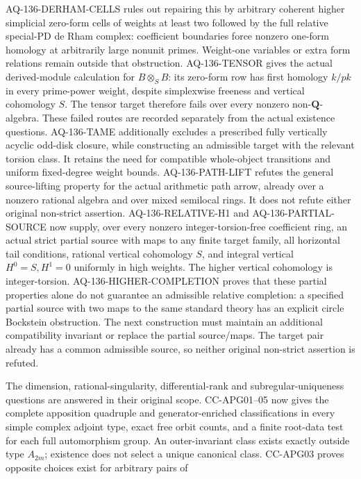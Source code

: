 \begin{description}[style=nextline,leftmargin=0pt]
AQ-136-DERHAM-CELLS rules out repairing this by arbitrary coherent
higher simplicial zero-form cells of weights at least two followed
by the full relative special-PD de Rham complex: coefficient
boundaries force nonzero one-form homology at arbitrarily large
nonunit primes. Weight-one variables or extra form relations
remain outside that obstruction.
AQ-136-TENSOR gives the actual derived-module calculation for
$B\otimes_S B$: its zero-form row has first homology $k/pk$
in every prime-power weight, despite simplexwise freeness and vertical
cohomology $S$. The tensor target therefore fails over every nonzero
non-$\mathbf Q$-algebra. These failed routes are recorded
separately from the actual existence questions.
AQ-136-TAME additionally excludes a prescribed fully vertically
acyclic odd-disk closure, while constructing an admissible target
with the relevant torsion class. It retains the need for compatible
whole-object transitions and uniform fixed-degree weight bounds. AQ-136-PATH-LIFT refutes the
general source-lifting property for the actual arithmetic path arrow,
already over a nonzero rational algebra and over mixed semilocal rings.
It does not refute either original non-strict assertion. AQ-136-RELATIVE-H1 and AQ-136-PARTIAL-SOURCE
now supply, over every nonzero integer-torsion-free coefficient ring,
an actual strict partial source with maps to any finite target family,
all horizontal tail conditions, rational vertical cohomology $S$,
and integral vertical $H^0=S,H^1=0$ uniformly in high weights.
The higher vertical cohomology is integer-torsion.
AQ-136-HIGHER-COMPLETION proves that these partial properties alone
do not guarantee an admissible relative completion: a specified
partial source with two maps to the same standard theory has an
explicit circle Bockstein obstruction. The next construction must
maintain an additional compatibility invariant or replace the partial
source/maps. The target pair already has a common admissible source,
so neither original non-strict assertion is refuted.
\item[Cote 123: the original apposition questions are now closed.]
The dimension, rational-singularity, differential-rank and
subregular-uniqueness questions are answered in their original scope.
CC-APG01--05 now gives the complete apposition quadruple and
generator-enriched classifications in every simple complex adjoint
type, exact free orbit counts, and a finite root-data test for each
full automorphism group. An outer-invariant class exists exactly
outside type $A_{2m}$; existence does not select a unique canonical
class. CC-APG03 proves opposite choices exist for arbitrary pairs of

\end{description}
